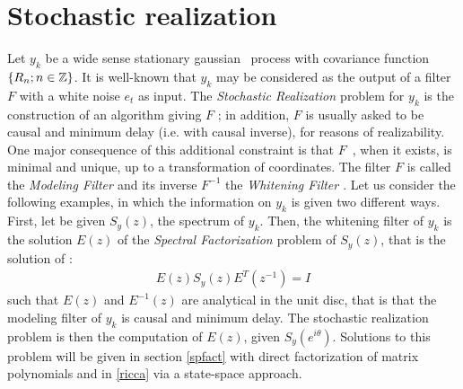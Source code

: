 

%

\label{stochastic realization}
\chapter{Stochastic realization}

Let $y_k$ be a wide sense stationary gaussian~ process with covariance
function $\{R_n;n\in {\Bbb Z} \}$. 
It is well-known that $y_k$ may be considered
as the output of a filter $F$ with a white noise $e_t$ as input. The {\em 
Stochastic Realization \em} problem for $y_k$ is the construction of an 
algorithm giving $F$ ; in addition, $F$ is usually asked to be causal 
and minimum delay (i.e. with causal inverse), 
for reasons of realizability. One major consequence of this additional 
constraint is that $F$~, when it exists, is minimal and unique, 
up to a transformation of coordinates. 
The filter $F$ is called the {\em Modeling 
Filter \em}  and its inverse $F^{-1}$ 
the {\em Whitening Filter \em} . 
Let us consider the following examples, in which the information 
on $y_k$ is given two different ways.
First, let be given $S_y(z)$, the spectrum  of $y_k$. 
Then, the whitening filter of $y_k$ is the solution $E(z)$ 
of the {\em Spectral Factorization \em} 
problem of $S_y(z)$, that is the solution of :
\begin{eqnarray}
E(z)S_y(z)E^{T}(z^{-1})=I
\label{e.ricc.1}
\end{eqnarray}
such that $E(z)$ and $E^{-1}(z)$ are analytical in the  unit disc, 
that is  that the modeling filter of $y_k$ is causal and minimum 
 delay. The stochastic realization problem is then the computation 
of $E(z)$, given $S_y(e^{i\theta})$. Solutions to this
problem will be given in section \ref{spfact} with direct factorization of
matrix polynomials and 
in \ref{ricca} via a state-space approach.

